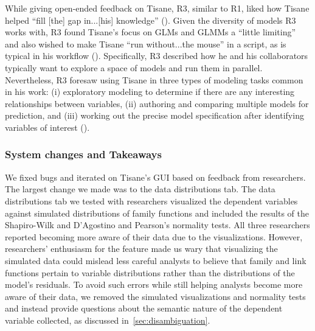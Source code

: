 While giving open-ended feedback on Tisane, R3, similar to R1, liked how Tisane helped ``fill
[the] gap in...[his] knowledge'' (\rqCognitive). Given the diversity of models
R3 works with, R3 found Tisane's focus on GLMs and GLMMs a ``little limiting'' and also
wished to make Tisane ``run without...the mouse'' in a script, as is typical in
his workflow (\rqWorkflow). Specifically, R3 described how he and his
collaborators typically want to explore a space of models and run them in
parallel. Nevertheless, R3 foresaw using Tisane in three types of modeling tasks
common in his work: (i) exploratory modeling to determine if there are any
interesting relationships between variables, (ii) authoring and comparing
multiple models for prediction, and (iii) working out the precise model
specification after identifying variables of interest (\rqFuture).

\subsubsection{System changes and Takeaways}

We fixed bugs and iterated on Tisane's GUI based on feedback from
researchers. The largest change we made was to the data distributions tab. The data distributions
tab we tested with researchers visualized the dependent variables
against simulated distributions of family functions and included the results of the Shapiro-Wilk and D'Agostino and Pearson's normality tests. All three researchers
reported becoming more aware of their data due to the visualizations. However, researchers' enthusiasm for the feature made us wary that visualizing the simulated data 
could mislead less careful analysts to believe that family and link functions pertain to variable
distributions rather than the distributions of the model's residuals. 
To avoid
such errors while still helping analysts become more aware of their data, we
removed the simulated visualizations and normality tests and instead provide questions about the semantic nature of the dependent variable
collected, as discussed in~\autoref{sec:disambiguation}.

